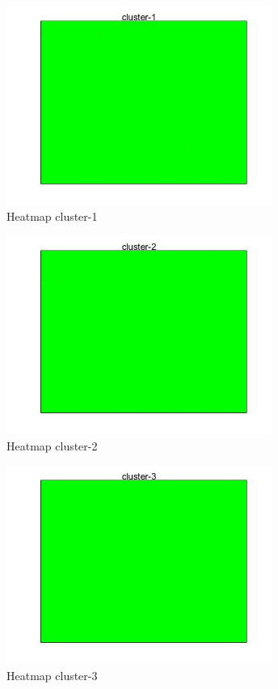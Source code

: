 \begin{figure}[htbp]
	\centering
	\includegraphics[height=6.5cm]{analisis/cluster-1.jpg}
	\caption{Heatmap cluster-1}
	\label{pic:cluster-1}
\end{figure}

\begin{figure}[htbp]
	\centering
	\includegraphics[height=6.5cm]{analisis/cluster-2.jpg}
	\caption{Heatmap cluster-2}
	\label{pic:cluster-2}
\end{figure}

\begin{figure}[htbp]
	\centering
	\includegraphics[height=6.5cm]{analisis/cluster-3.jpg}
	\caption{Heatmap cluster-3}
	\label{pic:cluster-3}
\end{figure}

